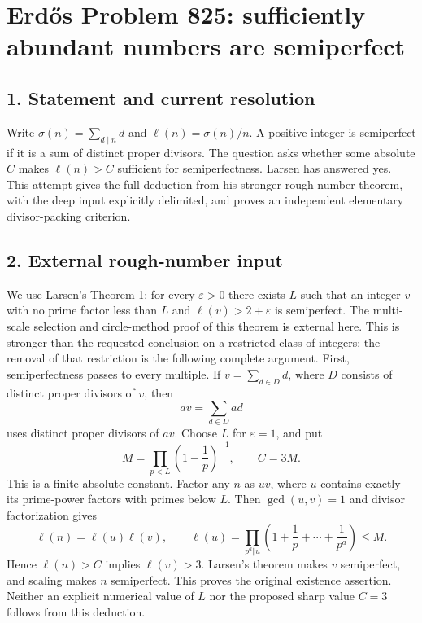 \section*{Erd\H{o}s Problem 825: sufficiently abundant numbers are semiperfect}
\subsection*{1. Statement and current resolution}
Write $\sigma(n)=\sum_{d\mid n}d$ and $\ell(n)=\sigma(n)/n$. A positive integer is semiperfect if it is a sum of distinct proper divisors. The question asks whether some absolute $C$ makes $\ell(n)>C$ sufficient for semiperfectness. Larsen has answered yes. This attempt gives the full deduction from his stronger rough-number theorem, with the deep input explicitly delimited, and proves an independent elementary divisor-packing criterion.
\subsection*{2. External rough-number input}
We use Larsen's Theorem 1: for every $\varepsilon>0$ there exists $L$ such that an integer $v$ with no prime factor less than $L$ and $\ell(v)>2+\varepsilon$ is semiperfect. The multi-scale selection and circle-method proof of this theorem is external here. This is stronger than the requested conclusion on a restricted class of integers; the removal of that restriction is the following complete argument.
First, semiperfectness passes to every multiple. If $v=\sum_{d\in D}d$, where $D$ consists of distinct proper divisors of $v$, then
\[
 av=\sum_{d\in D}ad
\]
uses distinct proper divisors of $av$.
Choose $L$ for $\varepsilon=1$, and put
\[
 M=\prod_{p<L}\left(1-\frac1p\right)^{-1},\qquad C=3M.
\]
This is a finite absolute constant. Factor any $n$ as $uv$, where $u$ contains exactly its prime-power factors with primes below $L$. Then $\gcd(u,v)=1$ and divisor factorization gives
\[
 \ell(n)=\ell(u)\ell(v),\qquad
 \ell(u)=\prod_{p^a\Vert u}\left(1+\frac1p+\cdots+\frac1{p^a}\right)\le M.
\]
Hence $\ell(n)>C$ implies $\ell(v)>3$. Larsen's theorem makes $v$ semiperfect, and scaling makes $n$ semiperfect. This proves the original existence assertion. Neither an explicit numerical value of $L$ nor the proposed sharp value $C=3$ follows from this deduction.
